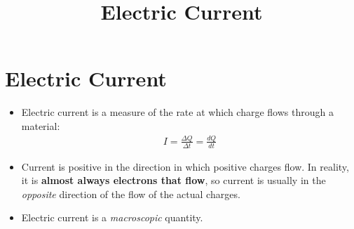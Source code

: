 \documentclass[aspectratio=169,
hyperref={colorlinks,urlcolor=blue}
]{beamer}
\begin{document}
\section{Electric Current}
\label{sec:electriccurrent}
\title{Electric Current}


\begin{frame}
\titlepage
\thispagestyle{empty}
\end{frame}


{
\begin{itemize}
 \item Electric current is a measure of the rate at which charge flows through a material:
 \begin{align*}
 I = \frac{\Delta Q}{\Delta t}= \frac{dQ}{dt}
 \end{align*}
 \item Current is positive in the direction in which positive charges flow. In reality, it is \textbf{almost always electrons
that flow}, so current is usually in the \textit{opposite} direction of the flow of the actual charges.
 \item Electric current is a \textit{macroscopic} quantity. 
\end{itemize}
}
\end{document}
